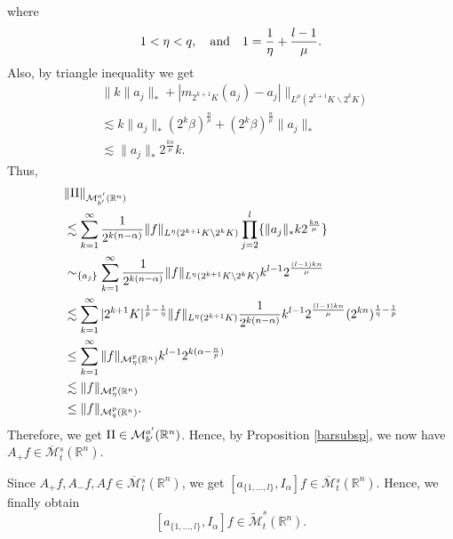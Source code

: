 \documentclass[11pt,a4]{article}
\numberwithin{equation}{section}
\theoremstyle{definition}
\theoremstyle{remark}
\begin{document}
where
\[
	1<\eta<q, \quad {\rm and} \quad 1=\frac{1}{\eta}+\frac{l-1}{\mu}.
\]
Also, by triangle inequality we get
\begin{align*}
	&\Big\| k\|a_j\|_* + |m_{2^{k+1}K}(a_j)-a_j| \Big\|_{L^{\mu}(2^{k+1}K \backslash 2^kK)}\\
	&\lesssim k\|a_j\|_* (2^k\beta)^{\frac{n}{\mu}} + (2^k\beta)^{\frac{n}{\mu}} \|a_j\|_* \\
	&\lesssim \|a_j\|_*2^{\frac{kn}{\mu}}k.
\end{align*}
Thus,
\begin{align*}
	&\|{\rm II}\|_{{\mathcal M}^{a'}_{b'}({\mathbb R}^n)}\\
	&\lesssim \sum_{k=1}^{\infty} \frac{1}{2^{k(n-\alpha)}} \|f\|_{L^{\eta}(2^{k+1}K \backslash 2^kK)} \prod_{j=2}^{l}\{ \|a_j\|_*k2^{\frac{kn}{\mu}} \}\\
	&\sim_{\{a_j\}} \sum_{k=1}^{\infty} \frac{1}{2^{k(n-\alpha)}} \|f\|_{L^{\eta}(2^{k+1}K \backslash 2^kK)} k^{l-1} 2^{\frac{(l-1)kn}{\mu}}\\
	&\lesssim \sum_{k=1}^{\infty} |2^{k+1}K|^{\frac{1}{p}-\frac{1}{\eta}} \|f\|_{L^{\eta}(2^{k+1}K)} \frac{1}{2^{k(n-\alpha)}} k^{l-1} 2^{\frac{(l-1)kn}{\mu}} (2^{kn})^{\frac{1}{\eta}-\frac{1}{p}}\\
	& \le \sum_{k=1}^{\infty} \|f\|_{{\mathcal M}^{p}_{\eta}({\mathbb R}^n)} k^{l-1} 2^{k(\alpha - \frac{n}{p})}\\
	&\lesssim \|f\|_{{\mathcal M}^{p}_{\eta}({\mathbb R}^n)}\\
	&\le \|f\|_{{\mathcal M}^{p}_{q}({\mathbb R}^n)}.
\end{align*}
Therefore, we get ${\rm II} \in {\mathcal M}{}^{a'}_{b'}({\mathbb R}^n)$. Hence, by Proposition \ref{barsubsp}, we now have $A_+f \in \overline{{\mathcal M}}{}^s_t({\mathbb R}^n)$. %

Since $A_+f, A_-f, Af \in \overline{{\mathcal M}}{}^s_t({\mathbb R}^n)$, we get $[a_{\{1, ... , l\}},I_{\alpha}]f \in \overline{{\mathcal M}}{}^s_t({\mathbb R}^n)$. 
Hence, we finally obtain
\[
	[a_{\{1, ... , l\}},I_{\alpha}]f \in \widetilde{\mathcal M}^{s}_t({\mathbb R}^n).
\] 
\end{document}
